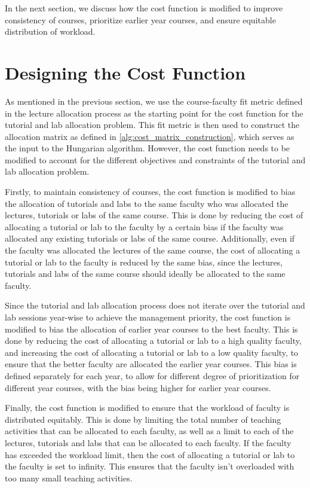 In the next section, we discuss how the cost function is modified to improve consistency of courses, prioritize earlier year courses, and ensure equitable distribution of workload.

\section{Designing the Cost Function}

As mentioned in the previous section, we use the course-faculty fit metric defined in the lecture allocation process as the starting point for the cost function for the tutorial and lab allocation problem. This fit metric is then used to construct the allocation matrix as defined in \autoref{alg:cost_matrix_construction}, which serves as the input to the Hungarian algorithm. However, the cost function needs to be modified to account for the different objectives and constraints of the tutorial and lab allocation problem.

Firstly, to maintain consistency of courses, the cost function is modified to bias the allocation of tutorials and labs to the same faculty who was allocated the lectures, tutorials or labs of the same course. This is done by reducing the cost of allocating a tutorial or lab to the faculty by a certain bias if the faculty was allocated any existing tutorials or labs of the same course.  Additionally, even if the faculty was allocated the lectures of the same course, the cost of allocating a tutorial or lab to the faculty is reduced by the same bias, since the lectures, tutorials and labs of the same course should ideally be allocated to the same faculty.

Since the tutorial and lab allocation process does not iterate over the tutorial and lab sessions year-wise to achieve the management priority, the cost function is modified to bias the allocation of earlier year courses to the best faculty. This is done by reducing the cost of allocating a tutorial or lab to a high quality faculty, and increasing the cost of allocating a tutorial or lab to a low quality faculty, to ensure that the better faculty are allocated the earlier year courses. This bias is defined separately for each year, to allow for different degree of prioritization for different year courses, with the bias being higher for earlier year courses.

Finally, the cost function is modified to ensure that the workload of faculty is distributed equitably. This is done by limiting the total number of teaching activities that can be allocated to each faculty, as well as a limit to each of the lectures, tutorials and labs that can be allocated to each faculty. If the faculty has exceeded the workload limit, then the cost of allocating a tutorial or lab to the faculty is set to infinity. This ensures that the faculty isn't overloaded with too many small teaching activities.

